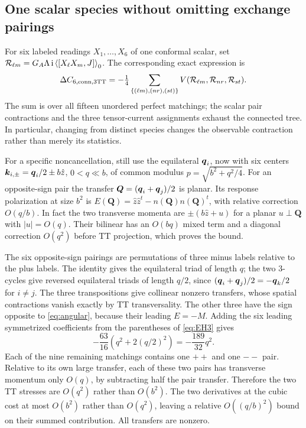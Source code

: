 \subsection{One scalar species without omitting exchange pairings}
For six labeled readings \(X_1,\ldots,X_6\) of one conformal scalar, set
\(\mathcal R_{\ell m}=G_A\Lambda\,\mathrm{i}\left\langle [X_\ell X_m,J]\right\rangle_0\).
The corresponding exact expression is
\begin{equation}
 \Delta C_{6,\mathrm{conn},3\mathrm{TT}}
 =-\tfrac14\sum_{\{(\ell m),(nr),(st)\}}
 V(\mathcal R_{\ell m},\mathcal R_{nr},\mathcal R_{st}).
 \label{eq:allpairs}
\end{equation}
The sum is over all fifteen unordered perfect matchings; the scalar pair contractions and the three tensor-current assignments exhaust the connected tree. In particular, changing from distinct species changes the observable contraction rather than merely its statistics.

For a specific noncancellation, still use the equilateral \(\boldsymbol q_i\), now with six centers \(\boldsymbol k_{i,\pm}=\boldsymbol q_i/2\pm b\hat z\), \(0<q\ll b\), of common modulus \(p=\sqrt{b^2+q^2/4}\). For an opposite-sign pair the transfer \(\boldsymbol Q=(\boldsymbol q_i+\boldsymbol q_j)/2\) is planar. Its response polarization at size \(b^2\) is \(E(\boldsymbol Q)=\hat z\hat z^t-n(\boldsymbol Q)n(\boldsymbol Q)^t\), with relative correction \(O(q/b)\). In fact the two transverse momenta are \(\pm(b\hat z+u)\) for a planar \(u\perp\boldsymbol Q\) with \(|u|=O(q)\). Their bilinear has an \(O(bq)\) mixed term and a diagonal correction \(O(q^2)\) before TT projection, which proves the bound.

The six opposite-sign pairings are permutations of three minus labels relative to the plus labels. The identity gives the equilateral triad of length \(q\); the two 3-cycles give reversed equilateral triads of length \(q/2\), since \((\boldsymbol q_i+\boldsymbol q_j)/2=-\boldsymbol q_k/2\) for \(i\ne j\). The three transpositions give collinear nonzero transfers, whose spatial contractions vanish exactly by TT transversality. The other three have the sign opposite to \eqref{eq:angular}, because their leading \(E=-M\). Adding the six leading symmetrized coefficients from the parentheses of \eqref{eq:EH3} gives
\begin{equation}
 -\frac{63}{16}\left(q^2+2(q/2)^2\right)=-\frac{189}{32}q^2.
 \label{eq:anglesingle}
\end{equation}
Each of the nine remaining matchings contains one \(++\) and one \(--\) pair. Relative to its own large transfer, each of these two pairs has transverse momentum only \(O(q)\), by subtracting half the pair transfer. Therefore the two TT stresses are \(O(q^2)\) rather than \(O(b^2)\). The two derivatives at the cubic cost at most \(O(b^2)\) rather than \(O(q^2)\), leaving a relative \(O((q/b)^2)\) bound on their summed contribution. All transfers are nonzero.

